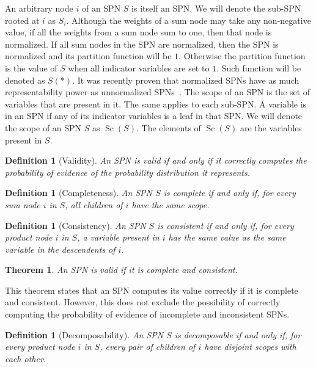 \documentclass{amsart}
\DeclareMathOperator*{\Sc}{\text{Sc}}
\theoremstyle{plain}
\newcounter{dummy-def}\numberwithin{dummy-def}{section}
\newtheorem{definition}[dummy-def]{Definition}
\newcounter{dummy-thm}\numberwithin{dummy-thm}{section}
\newtheorem{theorem}[dummy-thm]{Theorem}
\newcounter{dummy-prop}\numberwithin{dummy-prop}{section}
\newcounter{dummy-corollary}\numberwithin{dummy-corollary}{section}
\newcounter{dummy-ex}\numberwithin{dummy-ex}{section}
\newcounter{dummy-eg}\numberwithin{dummy-eg}{section}
\numberwithin{equation}{section}
\begin{document}
An arbitrary node $i$ of an SPN $S$ is itself an SPN\@. We will denote the sub-SPN rooted at $i$ as
$S_i$. Although the weights of a sum node may take any non-negative value, if all the weights from
a sum node sum to one, then that node is normalized. If all sum nodes in the SPN are normalized,
then the SPN is normalized and its partition function will be $1$. Otherwise the partition function
is the value of $S$ when all indicator variables are set to $1$. Such function will be denoted as
$S(*)$. It was recently proven that normalized SPNs have as much representability power as
unnormalized SPNs~\cite{theoretical-spn}. The scope of an SPN is the set of variables that are
present in it. The same applies to each sub-SPN\@. A variable is in an SPN if any of its indicator
variables is a leaf in that SPN\@. We will denote the scope of an SPN $S$ as $\Sc(S)$. The elements
of $\Sc(S)$ are the variables present in $S$.

\begin{definition}[Validity]
  An SPN is valid if and only if it correctly computes the probability of evidence of the
  probability distribution it represents.
\end{definition}

\begin{definition}[Completeness]
  An SPN $S$ is complete if and only if, for every sum node $i$ in $S$, all children of $i$ have
  the same scope.
\end{definition}

\begin{definition}[Consistency]
  An SPN $S$ is consistent if and only if, for every product node $i$ in $S$, a variable present in
  $i$ has the same value as the same variable in the descendents of $i$.
\end{definition}

\begin{theorem}
  An SPN is valid if it is complete and consistent.
\end{theorem}

This theorem states that an SPN computes its value correctly if it is complete and consistent.
However, this does not exclude the possibility of correctly computing the probability of evidence
of incomplete and inconsistent SPNs.

\begin{definition}[Decomposability]
  An SPN $S$ is decomposable if and only if, for every product node $i$ in $S$, every pair of
  children of $i$ have disjoint scopes with each other.
\end{definition}
\end{document}
